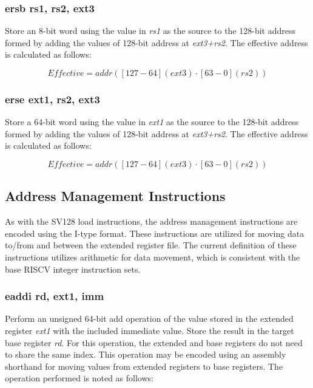 \documentclass{article}
\begin{document}
\subsubsection{ersb rs1, rs2, ext3}

Store an 8-bit word using the value in \textit{rs1} as the source 
to the 128-bit address formed by adding the values of
128-bit address at \textit{ext3+rs2}.  The effective address is calculated 
as follows: 

\begin{equation}
Effective = addr([127-64](ext3) \cdot [63-0](rs2))
\end{equation}

\subsubsection{erse ext1, rs2, ext3}

Store a 64-bit word using the value in \textit{ext1} as the source 
to the 128-bit address formed by adding the values of
128-bit address at \textit{ext3+rs2}.  The effective address is calculated 
as follows: 

\begin{equation}
Effective = addr([127-64](ext3) \cdot [63-0](rs2))
\end{equation}

\subsection{Address Management Instructions}
\label{sec:AddressManagementInstructions}

As with the SV128 load instructions, the address management instructions 
are encoded using the I-type format.  These instructions are utilized for 
moving data to/from and between the extended register file.  The current 
definition of these instructions utilizes arithmetic for data movement, 
which is consistent with the base RISCV integer instruction sets.

\subsubsection{eaddi rd, ext1, imm}

Perform an unsigned 64-bit add operation of the value stored in the extended 
register \textit{ext1} with the included immediate value.  Store the result 
in the target base register \textit{rd}.  For this operation, the extended and base registers 
do not need to share the same index.  This operation may be encoded 
using an assembly shorthand for moving values from extended registers 
to base registers.  The operation performed is noted as follows:
\end{document}
